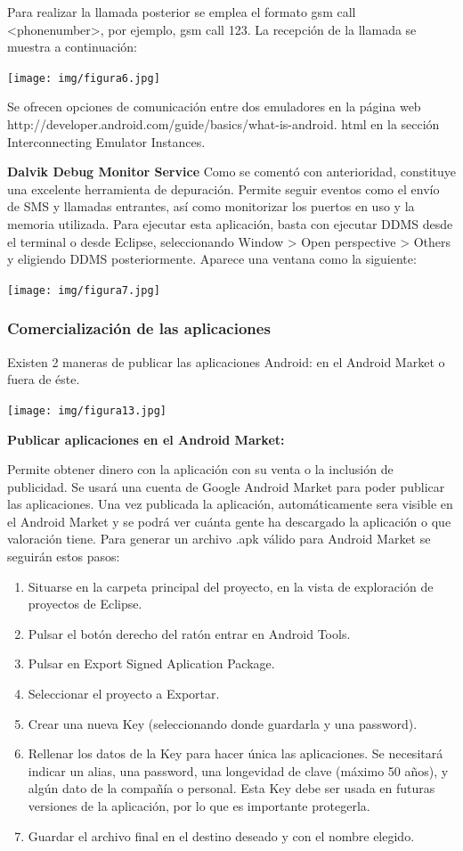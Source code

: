 \documentclass[12 pt, a4paper, twoside]{article}
\begin{document}
Para realizar la llamada posterior se emplea el formato gsm call <phonenumber>,
por ejemplo, gsm call 123. La recepción de la llamada se muestra a
continuación:
\begin{center}
  \texttt{[image: img/figura6.jpg]}
\end{center}

Se ofrecen opciones de comunicación entre dos emuladores en la página web
http://developer.android.com/guide/basics/what-is-android.
html en la sección Interconnecting Emulator Instances.

\textbf{Dalvik Debug Monitor Service}
Como se comentó con anterioridad, constituye una excelente herramienta de
depuración. Permite seguir eventos como el envío de SMS y llamadas entrantes,
así como monitorizar los puertos en uso y la memoria utilizada. Para ejecutar esta
aplicación, basta con ejecutar DDMS desde el terminal o desde Eclipse, seleccionando
Window > Open perspective > Others y eligiendo DDMS posteriormente.
Aparece una ventana como la siguiente:
\begin{center}
  \texttt{[image: img/figura7.jpg]}
\end{center}

\subsubsection{Comercialización de las aplicaciones}
Existen 2 maneras de publicar las aplicaciones Android: en el Android Market
o fuera de éste.
\begin{center}
  \texttt{[image: img/figura13.jpg]}
\end{center}

\textbf{Publicar aplicaciones en el Android Market:}

Permite obtener dinero con la aplicación con su venta o la inclusión de publicidad.
Se usará una cuenta de Google Android Market para poder publicar las aplicaciones.
Una vez publicada la aplicación, automáticamente sera visible en el
Android Market y se podrá ver cuánta gente ha descargado la aplicación o que
valoración tiene.
Para generar un archivo .apk válido para Android Market se seguirán estos
pasos:
\begin{enumerate}
\item Situarse en la carpeta principal del proyecto, en la vista de exploración de
proyectos de Eclipse.
\item Pulsar el botón derecho del ratón entrar en Android Tools.
\item Pulsar en Export Signed Aplication Package.
\item Seleccionar el proyecto a Exportar.
\item Crear una nueva Key (seleccionando donde guardarla y una password).
\item Rellenar los datos de la Key para hacer única las aplicaciones. Se necesitará
indicar un alias, una password, una longevidad de clave (máximo 50 años), y
algún dato de la compañía o personal. Esta Key debe ser usada en futuras
versiones de la aplicación, por lo que es importante protegerla.
\item Guardar el archivo final en el destino deseado y con el nombre elegido.
\end{enumerate}
\end{document}

